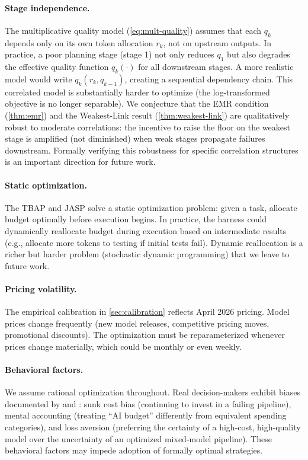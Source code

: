 \documentclass[11pt, a4paper, copyright]{googledeepmind}
\begin{document}
\paragraph{Stage independence.}
The multiplicative quality model (\cref{eq:mult-quality}) assumes that each $q_k$ depends only on its own token allocation $r_k$, not on upstream outputs. In practice, a poor planning stage (stage 1) not only reduces $q_1$ but also degrades the effective quality function $q_k(\cdot)$ for all downstream stages. A more realistic model would write $q_k(r_k, q_{k-1})$, creating a sequential dependency chain. This correlated model is substantially harder to optimize (the log-transformed objective is no longer separable). We conjecture that the EMR condition (\cref{thm:emr}) and the Weakest-Link result (\cref{thm:weakest-link}) are qualitatively robust to moderate correlations: the incentive to raise the floor on the weakest stage is amplified (not diminished) when weak stages propagate failures downstream. Formally verifying this robustness for specific correlation structures is an important direction for future work.

\paragraph{Static optimization.}
The TBAP and JASP solve a static optimization problem: given a task, allocate budget optimally before execution begins. In practice, the harness could dynamically reallocate budget during execution based on intermediate results (e.g., allocate more tokens to testing if initial tests fail). Dynamic reallocation is a richer but harder problem (stochastic dynamic programming) that we leave to future work.

\paragraph{Pricing volatility.}
The empirical calibration in \cref{sec:calibration} reflects April 2026 pricing. Model prices change frequently (new model releases, competitive pricing moves, promotional discounts). The optimization must be reparameterized whenever prices change materially, which could be monthly or even weekly.

\paragraph{Behavioral factors.}
We assume rational optimization throughout. Real decision-makers exhibit biases documented by \citet{kahneman1979} and \citet{thaler1999}: sunk cost bias (continuing to invest in a failing pipeline), mental accounting (treating ``AI budget'' differently from equivalent spending categories), and loss aversion (preferring the certainty of a high-cost, high-quality model over the uncertainty of an optimized mixed-model pipeline). These behavioral factors may impede adoption of formally optimal strategies.
\end{document}
